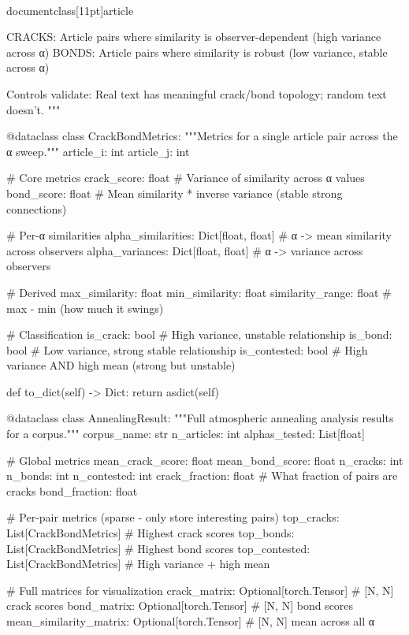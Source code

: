 \\documentclass[11pt]{article}
\begin{document}
\begin{CodeBlock}
{{{{{{{{CRACKS: Article pairs where similarity is observer-dependent (high variance across α)
BONDS: Article pairs where similarity is robust (low variance, stable across α)

Controls validate: Real text has meaningful crack/bond topology; random text doesn't.
"""


@dataclass
class CrackBondMetrics:
    """Metrics for a single article pair across the α sweep."""
    article_i: int
    article_j: int
    
    # Core metrics
    crack_score: float      # Variance of similarity across α values
    bond_score: float       # Mean similarity * inverse variance (stable strong connections)
    
    # Per-α similarities
    alpha_similarities: Dict[float, float]  # α -> mean similarity across observers
    alpha_variances: Dict[float, float]     # α -> variance across observers
    
    # Derived
    max_similarity: float
    min_similarity: float
    similarity_range: float  # max - min (how much it swings)
    
    # Classification
    is_crack: bool          # High variance, unstable relationship
    is_bond: bool           # Low variance, strong stable relationship
    is_contested: bool      # High variance AND high mean (strong but unstable)
    
    def to_dict(self) -> Dict:
        return asdict(self)


@dataclass 
class AnnealingResult:
    """Full atmospheric annealing analysis results for a corpus."""
    corpus_name: str
    n_articles: int
    alphas_tested: List[float]
    
    # Global metrics
    mean_crack_score: float
    mean_bond_score: float
    n_cracks: int
    n_bonds: int
    n_contested: int
    crack_fraction: float   # What fraction of pairs are cracks
    bond_fraction: float
    
    # Per-pair metrics (sparse - only store interesting pairs)
    top_cracks: List[CrackBondMetrics]      # Highest crack scores
    top_bonds: List[CrackBondMetrics]       # Highest bond scores
    top_contested: List[CrackBondMetrics]   # High variance + high mean
    
    # Full matrices for visualization
    crack_matrix: Optional[torch.Tensor]    # [N, N] crack scores
    bond_matrix: Optional[torch.Tensor]     # [N, N] bond scores
    mean_similarity_matrix: Optional[torch.Tensor]  # [N, N] mean across all α
    
}}}}}}}}
\end{CodeBlock}
\end{document}
